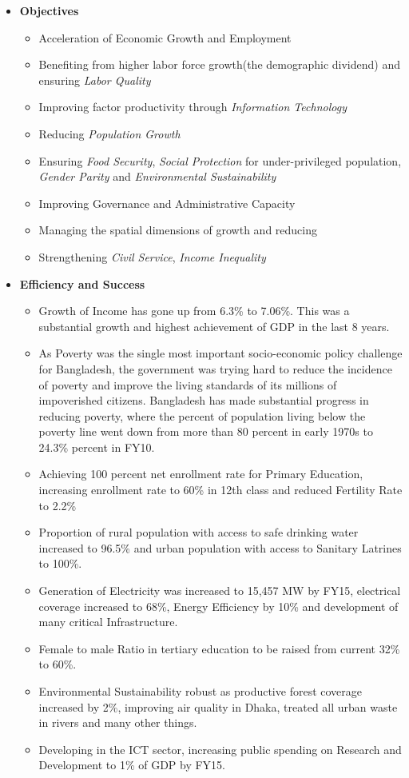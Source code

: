 \begin{itemize}
	\item\textbf{Objectives}
	\begin{itemize}
		\item Acceleration of Economic Growth and Employment
		\item Benefiting from higher labor force growth(the demographic dividend) and 
		ensuring \textit{Labor Quality}
		\item Improving factor productivity through \textit{Information Technology}
		\item Reducing \textit{Population Growth}
		\item Ensuring \textit{Food Security}, \textit{Social Protection} for under-privileged 
		population, \textit{Gender Parity} and \textit{Environmental Sustainability}
		\item Improving Governance and Administrative Capacity
		\item Managing the spatial dimensions of growth and reducing
		\item Strengthening \textit{Civil Service}, \textit{Income Inequality}
	\end{itemize}
	
	\item\textbf{Efficiency and Success}
	\begin{itemize}
		\item Growth of Income has gone up from 6.3\% to 7.06\%. This was a substantial 
		growth and highest achievement of GDP in the last 8 years.
		\item As Poverty was the single most important socio-economic policy challenge for Bangladesh, 
		the government was trying hard to reduce the incidence of poverty and improve 
		the living standards of its millions of impoverished citizens. Bangladesh has made 
		substantial progress in reducing poverty, where the percent of population living below 
		the poverty line went down from more than 80 percent in early 1970s to 24.3\% percent in FY10.
		\item Achieving 100 percent net enrollment rate for Primary Education, increasing enrollment 
		rate to 60\% in 12th class and reduced Fertility Rate to 2.2\%
		\item Proportion of rural population with access to safe drinking water increased to 96.5\% 
		and urban population with access to Sanitary Latrines to 100\%.
		\item Generation of Electricity was increased to 15,457 MW by FY15, electrical coverage 
		increased to 68\%, Energy Efficiency by 10\% and development of many critical Infrastructure.
		\item Female to male Ratio in tertiary education to be raised from current 32\% to 60\%.
		\item Environmental Sustainability robust as productive forest coverage increased by 2\%, 
		improving air quality in Dhaka, treated all urban waste in rivers and many other things.
		\item Developing in the ICT sector, increasing public spending on Research and Development 
		to 1\% of GDP by FY15.
	\end{itemize}
	

\end{itemize}
